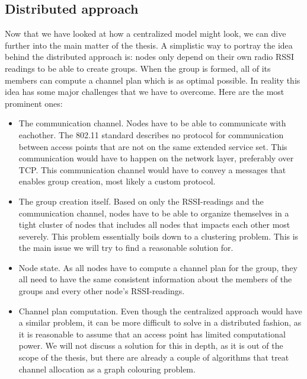 \subsection{Distributed approach}
Now that we have looked at how a centralized model might look, we can dive further into the main matter of the thesis. A simplistic way to portray the idea behind
the distributed approach is: nodes only depend on their own radio RSSI readings to be able to create groups. When the group is formed, all of its members can
compute a channel plan which is as optimal possible. In reality this idea has some major challenges that we have to overcome. Here are the most prominent ones: 
\begin{itemize}
	\item The communication channel. Nodes have to be able to communicate with eachother. The 802.11 standard describes no protocol for communication between access points that are not on the same extended service set. This communication would have to happen on the network layer, preferably over TCP. This communication channel would have to convey a messages that enables group creation,
		most likely a custom protocol. 
	\item The group creation itself. Based on only the RSSI-readings and the communication channel, nodes have to be able to organize themselves in a tight cluster of nodes that
		includes all nodes that impacts each other most severely. This problem essentially boils down to a clustering problem. This is the main issue we will
		try to find a reasonable solution for. 
	\item Node state. As all nodes have to compute a channel plan for the group, they all need to have the same consistent information about the members of the groups
		and every other node's RSSI-readings. 
	\item Channel plan computation. Even though the centralized approach would have a similar problem, it can be more difficult to solve in a distributed fashion, as 
		it is reasonable to assume that an access point has limited computational power. We will not discuss a solution for this in depth, as it is out of the scope
		of the thesis, but there are already a couple of algorithms that treat channel allocation as a graph colouring problem. 
\end{itemize}


